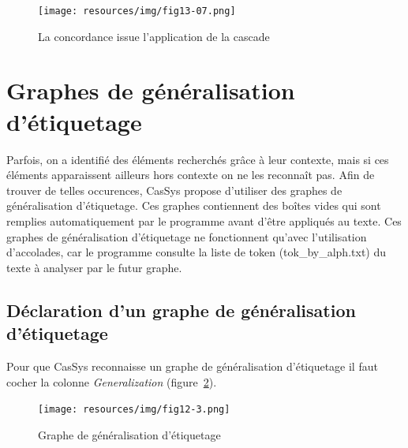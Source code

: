 \begin{figure}[!htb]
  \centering
  \texttt{[image: resources/img/fig13-07.png]}
  \caption{La concordance issue l'application de la cascade}
  \label{fig13-07}
\end{figure}

\section{Graphes de g\'{e}n\'{e}ralisation d'\'{e}tiquetage}

Parfois, on a identifi\'{e} des \'{e}l\'{e}ments recherch\'{e}s gr\^{a}ce \`{a} leur contexte, mais si ces \'{e}l\'{e}ments apparaissent ailleurs hors contexte on ne les reconna\^{i}t pas. Afin de trouver de telles occurences, CasSys propose d'utiliser des graphes de g\'{e}n\'{e}ralisation d'\'{e}tiquetage. Ces graphes contiennent des bo\^{i}tes vides qui sont remplies automatiquement par le programme avant d'\^{e}tre appliqu\'{e}s au texte. Ces graphes de g\'{e}n\'{e}ralisation d'\'{e}tiquetage ne fonctionnent qu'avec l'utilisation d'accolades, car le programme consulte la liste de token (tok\_by\_alph.txt) du texte \`{a} analyser par le futur graphe.

\subsection{D\'{e}claration d'un graphe de g\'{e}n\'{e}ralisation d'\'{e}tiquetage}
Pour que CasSys reconnaisse un graphe de g\'{e}n\'{e}ralisation d'\'{e}tiquetage il faut cocher la colonne \emph{Generalization} (figure~\ref{fig12-3}).
\begin{figure}[!htb]
  \centering
  \texttt{[image: resources/img/fig12-3.png]}
  \caption{Graphe de g\'{e}n\'{e}ralisation d'\'{e}tiquetage}
  \label{fig12-3}
\end{figure}


